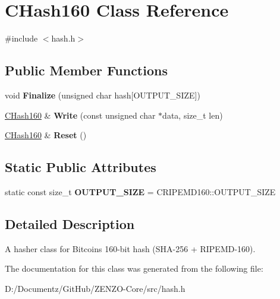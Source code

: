 \hypertarget{class_c_hash160}{}\section{C\+Hash160 Class Reference}
\label{class_c_hash160}


{\ttfamily \#include $<$hash.\+h$>$}

\subsection*{Public Member Functions}
\begin{DoxyCompactItemize}
\item 
\mbox{\label{class_c_hash160_a9bb08e1772002ae1a5d85017ba7952ee}} 
void {\bfseries Finalize} (unsigned char hash\mbox{[}O\+U\+T\+P\+U\+T\+\_\+\+S\+I\+ZE\mbox{]})
\item 
\mbox{\label{class_c_hash160_af56cdd9443013eb68b246aa8450217f2}} 
\mbox{\hyperlink{class_c_hash160}{C\+Hash160}} \& {\bfseries Write} (const unsigned char $\ast$data, size\+\_\+t len)
\item 
\mbox{\label{class_c_hash160_a971a8d59073455b1ef0ac0f65e964772}} 
\mbox{\hyperlink{class_c_hash160}{C\+Hash160}} \& {\bfseries Reset} ()
\end{DoxyCompactItemize}
\subsection*{Static Public Attributes}
\begin{DoxyCompactItemize}
\item 
\mbox{\label{class_c_hash160_a1a5618e17d91ea96e86d779f575211eb}} 
static const size\+\_\+t {\bfseries O\+U\+T\+P\+U\+T\+\_\+\+S\+I\+ZE} = C\+R\+I\+P\+E\+M\+D160\+::\+O\+U\+T\+P\+U\+T\+\_\+\+S\+I\+ZE
\end{DoxyCompactItemize}


\subsection{Detailed Description}
A hasher class for Bitcoin\textquotesingle{}s 160-\/bit hash (S\+H\+A-\/256 + R\+I\+P\+E\+M\+D-\/160). 

The documentation for this class was generated from the following file\+:\begin{DoxyCompactItemize}
\item 
D\+:/\+Documentz/\+Git\+Hub/\+Z\+E\+N\+Z\+O-\/\+Core/src/hash.\+h\end{DoxyCompactItemize}
